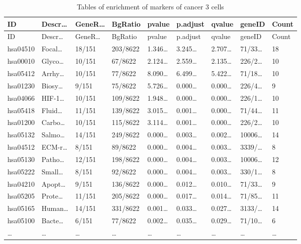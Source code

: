 \documentclass[
]{article}
\begin{document}
\begin{longtable}[]{@{}lllllllll@{}}
\caption{\label{tab:tables-of-enrichment-of-markers-of-cancer-3-cells}Tables of enrichment of markers of cancer 3 cells}\tabularnewline
\toprule
ID & Descr\ldots{} & GeneR\ldots{} & BgRatio & pvalue & p.adjust & qvalue & geneID & Count\tabularnewline
\midrule
\endfirsthead
\toprule
ID & Descr\ldots{} & GeneR\ldots{} & BgRatio & pvalue & p.adjust & qvalue & geneID & Count\tabularnewline
\midrule
\endhead
hsa04510 & Focal\ldots{} & 18/151 & 203/8622 & 1.346\ldots{} & 3.245\ldots{} & 2.707\ldots{} & 71/33\ldots{} & 18\tabularnewline
hsa00010 & Glyco\ldots{} & 10/151 & 67/8622 & 2.124\ldots{} & 2.559\ldots{} & 2.135\ldots{} & 226/2\ldots{} & 10\tabularnewline
hsa05412 & Arrhy\ldots{} & 10/151 & 77/8622 & 8.090\ldots{} & 6.499\ldots{} & 5.422\ldots{} & 71/18\ldots{} & 10\tabularnewline
hsa01230 & Biosy\ldots{} & 9/151 & 75/8622 & 5.726\ldots{} & 0.000\ldots{} & 0.000\ldots{} & 226/4\ldots{} & 9\tabularnewline
hsa04066 & HIF-1\ldots{} & 10/151 & 109/8622 & 1.948\ldots{} & 0.000\ldots{} & 0.000\ldots{} & 226/1\ldots{} & 10\tabularnewline
hsa05418 & Fluid\ldots{} & 11/151 & 139/8622 & 3.015\ldots{} & 0.001\ldots{} & 0.000\ldots{} & 71/44\ldots{} & 11\tabularnewline
hsa01200 & Carbo\ldots{} & 10/151 & 115/8622 & 3.114\ldots{} & 0.001\ldots{} & 0.000\ldots{} & 226/2\ldots{} & 10\tabularnewline
hsa05132 & Salmo\ldots{} & 14/151 & 249/8622 & 0.000\ldots{} & 0.003\ldots{} & 0.002\ldots{} & 10006\ldots{} & 14\tabularnewline
hsa04512 & ECM-r\ldots{} & 8/151 & 89/8622 & 0.000\ldots{} & 0.004\ldots{} & 0.003\ldots{} & 3339/\ldots{} & 8\tabularnewline
hsa05130 & Patho\ldots{} & 12/151 & 198/8622 & 0.000\ldots{} & 0.004\ldots{} & 0.003\ldots{} & 10006\ldots{} & 12\tabularnewline
hsa05222 & Small\ldots{} & 8/151 & 92/8622 & 0.000\ldots{} & 0.004\ldots{} & 0.003\ldots{} & 330/1\ldots{} & 8\tabularnewline
hsa04210 & Apopt\ldots{} & 9/151 & 136/8622 & 0.000\ldots{} & 0.012\ldots{} & 0.010\ldots{} & 71/33\ldots{} & 9\tabularnewline
hsa05205 & Prote\ldots{} & 11/151 & 205/8622 & 0.000\ldots{} & 0.017\ldots{} & 0.014\ldots{} & 71/85\ldots{} & 11\tabularnewline
hsa05165 & Human\ldots{} & 14/151 & 331/8622 & 0.001\ldots{} & 0.033\ldots{} & 0.027\ldots{} & 3133/\ldots{} & 14\tabularnewline
hsa05100 & Bacte\ldots{} & 6/151 & 77/8622 & 0.002\ldots{} & 0.035\ldots{} & 0.029\ldots{} & 71/10\ldots{} & 6\tabularnewline
\ldots{} & \ldots{} & \ldots{} & \ldots{} & \ldots{} & \ldots{} & \ldots{} & \ldots{} & \ldots{}\tabularnewline
\bottomrule
\end{longtable}
\end{document}
